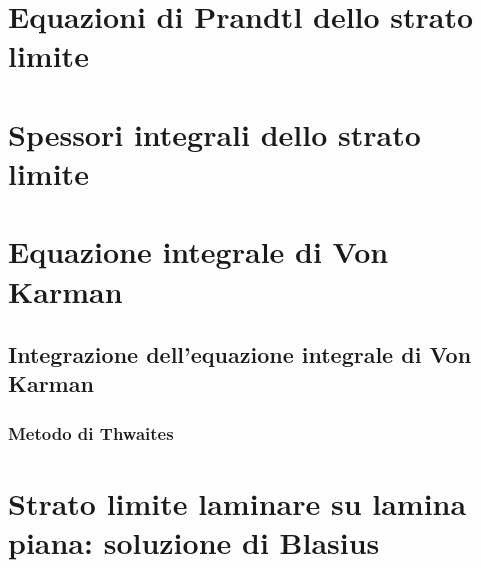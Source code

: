 \section{Equazioni di Prandtl dello strato limite}

\section{Spessori integrali dello strato limite}

\section{Equazione integrale di Von Karman}

\subsection{Integrazione dell'equazione integrale di Von Karman}

\subsubsection{Metodo di Thwaites}


\section{Strato limite laminare su lamina piana: soluzione di Blasius}
